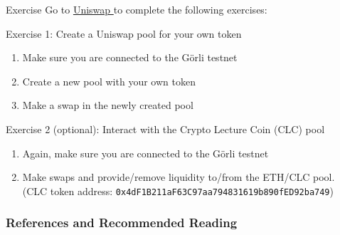 \documentclass[handout]{beamer}
\begin{document}
\begin{frame}{Exercise}
	Go to \href{https://app.uniswap.org/}{Uniswap \link} to complete the following exercises:
	\vspace{.5cm}

	\begin{exercise}{Exercise 1: Create a Uniswap pool for your own token}
		\begin{enumerate}
			\item Make sure you are connected to the Görli testnet
			\item Create a new pool with your own token
			\item Make a swap in the newly created pool
		\end{enumerate}
	\end{exercise}
	\vspace{.5cm}
	
	
	\begin{exercise}{Exercise 2 (optional): Interact with the Crypto Lecture Coin (CLC) pool}
		\begin{enumerate}
			\item Again, make sure you are connected to the Görli testnet
			\item Make swaps and provide/remove liquidity to/from the ETH/CLC pool.\\ (CLC token address: \texttt{0x4dF1B211aF63C97aa794831619b890fED92ba749})
		\end{enumerate}
	\end{exercise}
\end{frame}



\begin{frame}%
\frametitle{References and Recommended Reading}
\nocite{FS:21}
		
		
	
\end{frame}
\end{document}
